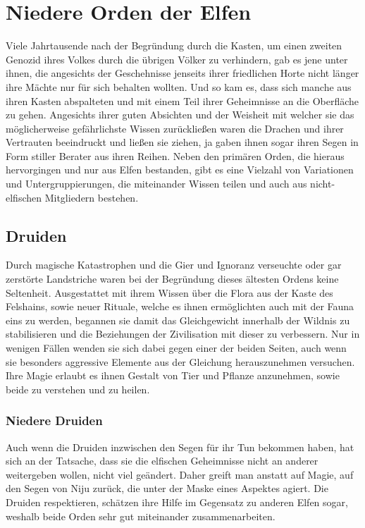 \documentclass[a4paper,12pt,oneside]{book}
\begin{document}
\chapter{Niedere Orden der Elfen}
Viele Jahrtausende nach der Begründung durch die Kasten, um einen zweiten Genozid ihres Volkes durch die übrigen Völker zu verhindern, gab es jene unter ihnen, die angesichts der Geschehnisse jenseits ihrer friedlichen Horte nicht länger ihre Mächte nur für sich behalten wollten. Und so kam es, dass sich manche aus ihren Kasten abspalteten und mit einem Teil ihrer Geheimnisse an die Oberfläche zu gehen. Angesichts ihrer guten Absichten und der Weisheit mit welcher sie das möglicherweise gefährlichste Wissen zurückließen waren die Drachen und ihrer Vertrauten beeindruckt und ließen sie ziehen, ja gaben ihnen sogar ihren Segen in Form stiller Berater aus ihren Reihen. Neben den primären Orden, die hieraus hervorgingen und nur aus Elfen bestanden, gibt es eine Vielzahl von Variationen und Untergruppierungen, die miteinander Wissen teilen und auch aus nicht-elfischen Mitgliedern bestehen. 
\section{Druiden}
Durch magische Katastrophen und die Gier und Ignoranz verseuchte oder gar zerstörte Landstriche waren bei der Begründung dieses ältesten Ordens keine Seltenheit. Ausgestattet mit ihrem Wissen über die Flora aus der Kaste des Felshains, sowie neuer Rituale, welche es ihnen ermöglichten auch mit der Fauna eins zu werden, begannen sie damit das Gleichgewicht innerhalb der Wildnis zu stabilisieren und die Beziehungen der Zivilisation mit dieser zu verbessern. Nur in wenigen Fällen wenden sie sich dabei gegen einer der beiden Seiten, auch wenn sie besonders aggressive Elemente aus der Gleichung herauszunehmen versuchen. Ihre Magie erlaubt es ihnen Gestalt von Tier und Pflanze anzunehmen, sowie beide zu verstehen und zu heilen.
\subsection{Niedere Druiden}
Auch wenn die Druiden inzwischen den Segen für ihr Tun bekommen haben, hat sich an der Tatsache, dass sie die elfischen Geheimnisse nicht an anderer weitergeben wollen, nicht viel geändert. Daher greift man anstatt auf Magie, auf den Segen von Niju zurück, die unter der Maske eines Aspektes agiert. Die Druiden respektieren, schätzen ihre Hilfe im Gegensatz zu anderen Elfen sogar, weshalb beide Orden sehr gut miteinander zusammenarbeiten.
\end{document}
